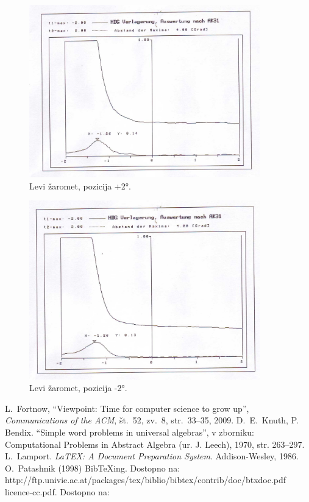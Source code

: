 \documentclass[oneside, a4paper, 12pt]{book}
\newcommand{\BibTeX}{{\sc Bib}\TeX}
\begin{document}
\begin{figure}
\begin{center}
\includegraphics[width=10cm]{slike/fotometer-levi-+2.jpg}
\end{center}
\caption{Levi žaromet, pozicija +2°.}
\label{pic:opt-g}
\end{figure}

\begin{figure}
\begin{center}
\includegraphics[width=10cm]{slike/fotometer-levi--2.jpg}
\end{center}
\caption{Levi žaromet, pozicija -2°.}
\label{pic:opt-g}
\end{figure}



\begin{thebibliography}{99}
 L.\ Fortnow, ``Viewpoint: Time for computer science to grow up'',
{\it Communications of the ACM}, št.\ 52, zv.\ 8, str.\ 33--35, 2009.
 D.\ E.\ Knuth, P. Bendix. ``Simple word problems in universal algebras'', v zborniku: Computational Problems in Abstract Algebra (ur. J. Leech), 1970, str. 263--297.
 L.\ Lamport. {\it LaTEX: A Document Preparation System}. Addison-Wesley, 1986.
 O.\ Patashnik (1998) \BibTeX{}ing. 
Dostopno na:\\ http://ftp.univie.ac.at/packages/tex/biblio/bibtex/contrib/doc/btxdoc.pdf
 licence-cc.pdf. Dostopno na: 
\end{thebibliography}
\end{document}
